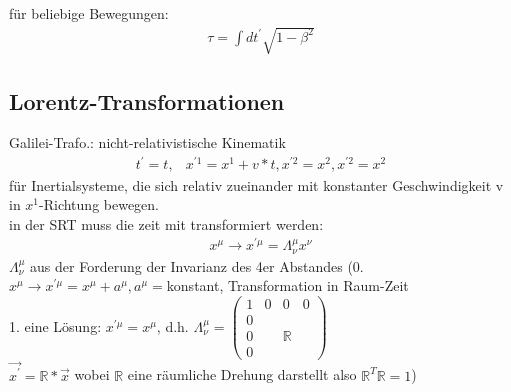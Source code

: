 \documentclass[a4paper]{article}
\begin{document}
für beliebige Bewegungen:
\begin{align}
\tau=\int dt^{'}\sqrt{1-\beta^2}
\end{align}
\subsection{Lorentz-Transformationen}
Galilei-Trafo.: nicht-relativistische Kinematik
\begin{align}
t^{'}=t, & x^{'1}=x^1+v*t, x^{'2}=x^2,x^{'2}=x^2
\end{align}
für Inertialsysteme, die sich relativ zueinander mit konstanter Geschwindigkeit
v in $x^1$-Richtung bewegen.\\
in der SRT muss die zeit mit transformiert werden:
\begin{align}
x^{\mu}\rightarrow x^{'\mu}=\Lambda^\mu_\nu x^\nu
\end{align}
$\Lambda^\mu_\nu$ aus der Forderung der Invarianz des 4er Abstandes
(0. $x^{\mu}\rightarrow x^{'\mu}=x^{\mu}+a^{\mu}, a^\mu=$konstant,
Transformation in Raum-Zeit\\
1. eine Lösung: $x^{'\mu}=x^{\mu}$, d.h. $\Lambda^\mu_\nu= \begin{pmatrix} 1 &
0& 0&0\\ 0& \\ 0& &  \mathbb{R} \\ 0 \end{pmatrix}$ \\
$\vec{x^{'}}= \mathbb{R}*\vec{x}$ wobei $ \mathbb{R}$ eine räumliche Drehung
darstellt also $ \mathbb{R}^T \mathbb{R}= 1$)\\
\end{document}
